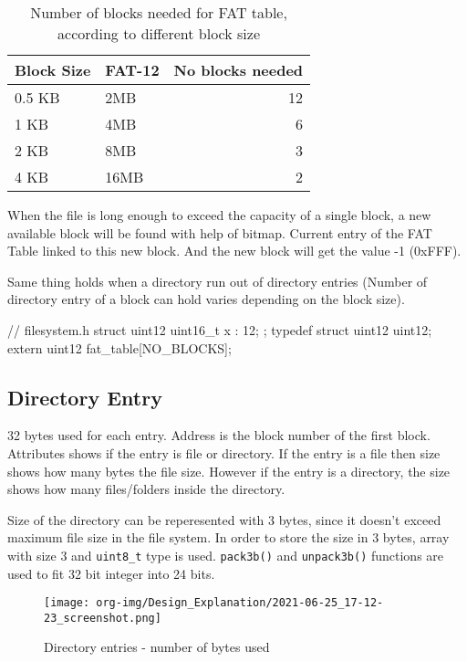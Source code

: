 \documentclass[a4paper]{article}
\begin{document}
\begin{table}[htbp]
\caption{Number of blocks needed for FAT table, according to different block size}
\centering
\begin{tabular}{l|l|r}
Block Size & FAT-12 & No blocks needed\\
\hline
\hline
0.5 KB & 2MB & 12\\
\hline
1 KB & 4MB & 6\\
\hline
2 KB & 8MB & 3\\
\hline
4 KB & 16MB & 2\\
\end{tabular}
\end{table}

\quad

When the file is long enough to exceed the capacity of a single block, a new available block will be found with help of bitmap. Current entry of the FAT Table linked to this new block. And the new block will get the value -1 (0xFFF).

Same thing holds when a directory run out of directory entries (Number of directory entry of a block can hold varies depending on the block size).

\begin{ccode}
// filesystem.h
struct uint12 {
  uint16_t x : 12;
};
typedef struct uint12 uint12;
extern uint12 fat_table[NO_BLOCKS];
\end{ccode}

\subsection*{Directory Entry}
\label{sec:orgfdd6a1f}

32 bytes used for each entry. Address is the block number of the first block. Attributes shows if the entry is file or directory. If the entry is a file then size shows how many bytes the file size. However if the entry is a directory, the size shows how many files/folders inside the directory. 

Size of the directory can be reperesented with 3 bytes, since it doesn't exceed maximum file size in the file system. In order to store the size in 3 bytes, array with size 3 and \texttt{uint8\_t} type is used. \texttt{pack3b()} and \texttt{unpack3b()} functions are used to fit 32 bit integer into 24 bits.

\quad

\begin{figure}[htbp]
\centering
\texttt{[image: org-img/Design\_Explanation/2021-06-25\_17-12-23\_screenshot.png]}
\caption{Directory entries - number of bytes used}
\end{figure}
\end{document}
